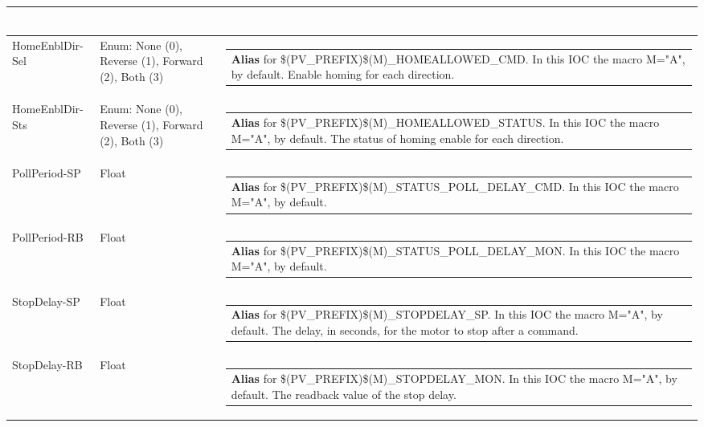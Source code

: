 \documentclass[openany]{article}
\begin{document}
\begin{longtable}{| m{4.5cm} m{2.5cm}  m{8.5cm} |}
\begin{tabular}{@{}m{6cm}@{}}
            \end{tabular} \hypertarget{pv:home-enbl-dir}{}\\ \hline
        HomeEnblDir-Sel & Enum: None (0), Reverse (1), Forward (2), Both (3) & \begin{tabular}{@{}m{6cm}@{}}
                \textbf{\color{blue} Alias} for \$(PV\_PREFIX)\$(M)\_HOMEALLOWED\_CMD. In this IOC the macro M="A", by default. Enable homing for each direction.
            \end{tabular} \hypertarget{}{}\\ \hline
        HomeEnblDir-Sts & Enum: None (0), Reverse (1), Forward (2), Both (3) & \begin{tabular}{@{}m{6cm}@{}}
                \textbf{\color{blue} Alias} for \$(PV\_PREFIX)\$(M)\_HOMEALLOWED\_STATUS. In this IOC the macro M="A", by default. The status of homing enable for each direction.
            \end{tabular} \hypertarget{pv:poll-period}{}\\ \hline
        PollPeriod-SP & Float & \begin{tabular}{@{}m{6cm}@{}}
                \textbf{\color{blue} Alias} for \$(PV\_PREFIX)\$(M)\_STATUS\_POLL\_DELAY\_CMD. In this IOC the macro M="A", by default.
            \end{tabular} \hypertarget{}{}\\ \hline
        PollPeriod-RB & Float & \begin{tabular}{@{}m{6cm}@{}}
                \textbf{\color{blue} Alias} for \$(PV\_PREFIX)\$(M)\_STATUS\_POLL\_DELAY\_MON. In this IOC the macro M="A", by default.
            \end{tabular} \hypertarget{pv:stop-delay}{}\\ \hline
        StopDelay-SP & Float & \begin{tabular}{@{}m{6cm}@{}}
                \textbf{\color{blue} Alias} for \$(PV\_PREFIX)\$(M)\_STOPDELAY\_SP. In this IOC the macro M="A", by default. The delay, in seconds, for the motor to stop after a command.
            \end{tabular} \hypertarget{}{}\\ \hline
        StopDelay-RB & Float & \begin{tabular}{@{}m{6cm}@{}}
                \textbf{\color{blue} Alias} for \$(PV\_PREFIX)\$(M)\_STOPDELAY\_MON. In this IOC the macro M="A", by default. The readback value of the stop delay.

\end{tabular}
\end{longtable}
\end{document}
